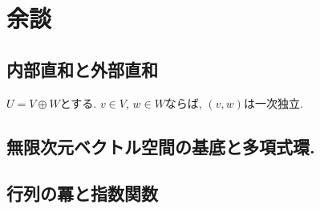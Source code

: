 \begin{quiz}
\end{quiz}






\chapter{余談}
\section{内部直和と外部直和}
\begin{prop}
  $U=V\oplus W$とする.
  $v\in V$, $w\in W$ならば,
  $(v,w)$は一次独立.
\end{prop}

\section{無限次元ベクトル空間の基底と多項式環.}

\section{行列の冪と指数関数}
\begin{quiz}
\end{quiz}


\chapter{}
\begin{quiz}
\end{quiz}


